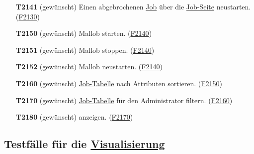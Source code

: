 \begin{itemize}
    \item[\textbf{T2141}] (gewünscht) Einen abgebrochenen \hyperref[B:Jobs]{Job} über die \hyperref[pages:job-page]{Job-Seite} neustarten. (\hyperref[FA:Web-Interface:Neustart]{F2130})
    
    \item[\textbf{T2150}] (gewünscht) \gls{Mallob} starten. (\hyperref[FA:Web-Interface:Verwalten von Malllob]{F2140})
    
    \item[\textbf{T2151}] (gewünscht) \gls{Mallob} stoppen. (\hyperref[FA:Web-Interface:Verwalten von Malllob]{F2140})
    
    \item[\textbf{T2152}] (gewünscht) \gls{Mallob} neustarten. (\hyperref[FA:Web-Interface:Verwalten von Malllob]{F2140})
    
    \item[\textbf{T2160}] (gewünscht) \hyperref[pages:job-table]{Job-Tabelle} nach Attributen sortieren. (\hyperref[FA:Web-Interface:Sortieren der Tabelle]{F2150})
    
    \item[\textbf{T2170}] (gewünscht) \hyperref[pages:job-table]{Job-Tabelle} für den \gls{Administrator} filtern. (\hyperref[FA:Web-Interface:Filtern für Admins]{F2160})
    
    
    \item[\textbf{T2180}] (gewünscht)  anzeigen. (\hyperref[FA:Web-Interface:Anzeigen von Plugins]{F2170})
    
\end{itemize}

\subsection{Testfälle für die \hyperref[pages:visualization]{Visualisierung}}

